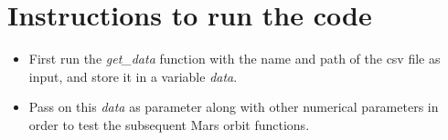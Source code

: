 \documentclass[11pt]{article}
\begin{document}
\section{Instructions to run the code}\label{section-instructions}

\begin{itemize}
    \item First run the \emph{get\_data} function with the name and path of the csv file as input, and store it in a variable \emph{data}.
    \item Pass on this \emph{data} as parameter along with other numerical parameters in order to test the subsequent Mars orbit functions.
\end{itemize}
\end{document}
